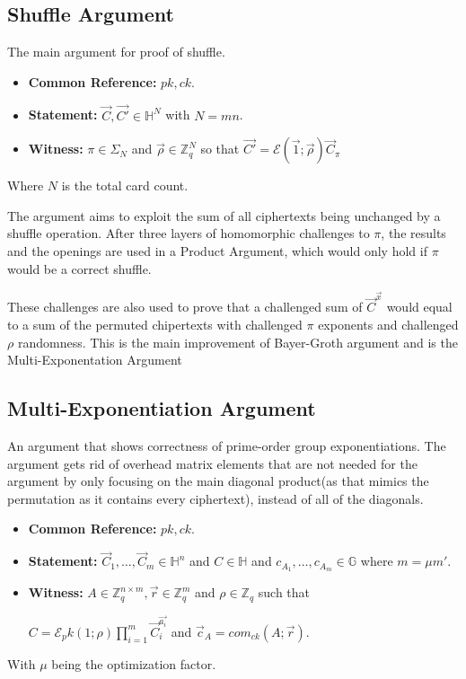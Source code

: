 \documentclass[12pt,a4paper]{report}
\begin{document}
\subsection*{Shuffle Argument} 
The main argument for proof of shuffle.
\begin{itemize}
	\item \textbf{Common Reference:} $pk, ck$.
	\item \textbf{Statement:} $\vec{C}, \vec{C'} \in \mathbb{H}^N$ with $N = mn$.
	\item \textbf{Witness:} $\pi \in \Sigma_N$ and $\vec{\rho} \in \mathbb{Z}^{N}_q$ so that $\vec{C'} = \mathcal{E}(\vec{1}; \vec{\rho})\vec{C}_\pi$
\end{itemize}
Where $N$ is the total card count.\par
The argument aims to exploit the sum of all ciphertexts being unchanged by a shuffle operation.
After three layers of homomorphic challenges to $\pi$, the results and the openings are used in a Product Argument, 
which would only hold if $\pi$ would be a correct shuffle.\par
These challenges are also used to prove that a challenged sum of $\vec{C}^{\vec{x}}$ would
equal to a sum of the permuted chipertexts with challenged $\pi$ exponents and challenged $\rho$ randomness.
This is the main improvement of Bayer-Groth argument and is the Multi-Exponentation Argument
\subsection*{Multi-Exponentiation Argument} An argument that shows correctness of prime-order group exponentiations. 
The argument gets rid of overhead matrix elements that are not needed for the argument by only focusing on the main diagonal product(as that mimics the permutation as it contains every ciphertext), instead of all of the diagonals. 
\begin{itemize}
	\item \textbf{Common Reference:} $pk, ck$.
	\item \textbf{Statement:} $\vec{C}_1,\ldots,\vec{C}_m \in \mathbb{H}^n$ and $C \in \mathbb{H}$ and $c_{A_1},\ldots,c_{A_m} \in \mathbb{G}$ where $m = \mu m'$.
	\item \textbf{Witness:} $A \in \mathbb{Z}_{q}^{n \times m}, \vec{r} \in \mathbb{Z}_{q}^{m}$ and $\rho \in \mathbb{Z}_q$ such that
		\begin{center}
			$\displaystyle C = \mathcal{E}_pk(1; \rho) \prod_{i=1}^m \vec{C}_{i}^{\vec{a_i}}$ and $\vec{c}_A = com_{ck}(A; \vec{r})$.
		\end{center}
\end{itemize}
With $\mu$ being the optimization factor.
\end{document}
